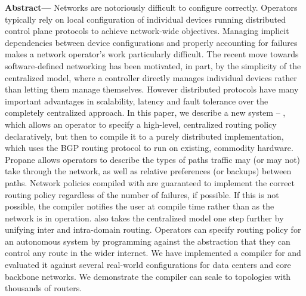 \textbf{Abstract---}
Networks are notoriously difficult to configure correctly. 
Operators typically rely on local configuration of individual devices running 
distributed control plane protocols to achieve network-wide objectives. 
Managing implicit dependencies between device configurations and properly accounting for failures makes 
a network operator's work particularly difficult. 
%
The recent move towards software-defined networking has been motivated, in part, 
by the simplicity of the centralized model, where a controller directly manages 
individual devices rather than letting them manage themselves. However distributed 
protocols have many important advantages in scalability,
latency and fault tolerance over the completely centralized approach.
%
In this paper, we describe a new system -- \sysname, which allows an operator to specify a high-level, 
centralized routing policy declaratively, but then to compile it to a purely distributed 
implementation, which uses the BGP routing protocol to run on existing, commodity hardware. 
%
Propane allows operators to describe the types of paths traffic may (or may not) take 
through the network, as well as relative preferences (or backups) between paths. 
%
Network policies compiled with \sysname are guaranteed to implement the correct routing policy regardless of the number of failures, if possible.  If this is not possible, the compiler notifies the user at compile time rather than as the network is in 
operation.
%
\sysname also takes the centralized model one step further by unifying inter and intra-domain routing. Operators can specify routing policy for an autonomous system by programming against the abstraction that they can control any route in the wider internet.
%
We have implemented a compiler for \sysname and evaluated it against several real-world configurations for data centers and core backbone networks. We demonstrate the \sysname compiler can scale to 
topologies with thousands of routers.
